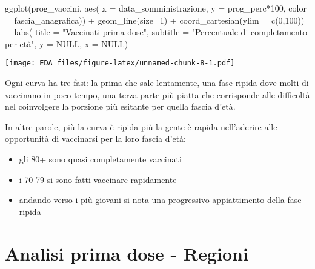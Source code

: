 \documentclass[
]{article}
\newenvironment{Shaded}{\begin{snugshade}}{\end{snugshade}}
\newcommand{\AttributeTok}[1]{\textcolor[rgb]{0.77,0.63,0.00}{#1}}
\newcommand{\ConstantTok}[1]{\textcolor[rgb]{0.00,0.00,0.00}{#1}}
\newcommand{\DecValTok}[1]{\textcolor[rgb]{0.00,0.00,0.81}{#1}}
\newcommand{\FunctionTok}[1]{\textcolor[rgb]{0.00,0.00,0.00}{#1}}
\newcommand{\NormalTok}[1]{#1}
\newcommand{\SpecialCharTok}[1]{\textcolor[rgb]{0.00,0.00,0.00}{#1}}
\newcommand{\StringTok}[1]{\textcolor[rgb]{0.31,0.60,0.02}{#1}}
\providecommand{\tightlist}{%
  \setlength{\itemsep}{0pt}\setlength{\parskip}{0pt}}
\begin{document}
\begin{Shaded}
\begin{Highlighting}[]
\FunctionTok{ggplot}\NormalTok{(prog\_vaccini, }
       \FunctionTok{aes}\NormalTok{( }\AttributeTok{x =}\NormalTok{ data\_somministrazione,}
            \AttributeTok{y =}\NormalTok{ prog\_perc}\SpecialCharTok{*}\DecValTok{100}\NormalTok{,}
            \AttributeTok{color =}\NormalTok{ fascia\_anagrafica)) }\SpecialCharTok{+}
  \FunctionTok{geom\_line}\NormalTok{(}\AttributeTok{size=}\DecValTok{1}\NormalTok{) }\SpecialCharTok{+}
  \FunctionTok{coord\_cartesian}\NormalTok{(}\AttributeTok{ylim =} \FunctionTok{c}\NormalTok{(}\DecValTok{0}\NormalTok{,}\DecValTok{100}\NormalTok{)) }\SpecialCharTok{+}
  \FunctionTok{labs}\NormalTok{( }\AttributeTok{title =} \StringTok{"Vaccinati prima dose"}\NormalTok{,}
        \AttributeTok{subtitle =} \StringTok{"Percentuale di completamento per età"}\NormalTok{,}
        \AttributeTok{y =} \ConstantTok{NULL}\NormalTok{,}
        \AttributeTok{x =} \ConstantTok{NULL}\NormalTok{)}
\end{Highlighting}
\end{Shaded}

\texttt{[image: EDA\_files/figure-latex/unnamed-chunk-8-1.pdf]}

Ogni curva ha tre fasi: la prima che sale lentamente, una fase ripida
dove molti di vaccinano in poco tempo, una terza parte più piatta che
corrisponde alle difficoltà nel coinvolgere la porzione più esitante per
quella fascia d'età.

In altre parole, più la curva è ripida più la gente è rapida
nell'aderire alle opportunità di vaccinarsi per la loro fascia d'età:

\begin{itemize}
\tightlist
\item
  gli 80+ sono quasi completamente vaccinati
\item
  i 70-79 si sono fatti vaccinare rapidamente
\item
  andando verso i più giovani si nota una progressivo appiattimento
  della fase ripida
\end{itemize}

\hypertarget{analisi-prima-dose---regioni}{%
\section{Analisi prima dose -
Regioni}\label{analisi-prima-dose---regioni}}
\end{document}
